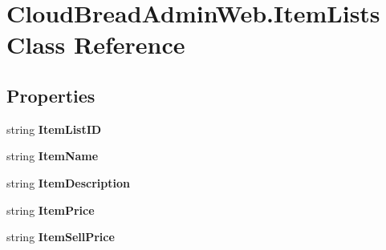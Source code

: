 \hypertarget{class_cloud_bread_admin_web_1_1_item_lists}{}\section{Cloud\+Bread\+Admin\+Web.\+Item\+Lists Class Reference}
\label{class_cloud_bread_admin_web_1_1_item_lists}
\subsection*{Properties}
\begin{DoxyCompactItemize}
\item 
string {\bfseries Item\+List\+ID}\hypertarget{class_cloud_bread_admin_web_1_1_item_lists_aef30485acfa501623200c6cea60c653c}{}\label{class_cloud_bread_admin_web_1_1_item_lists_aef30485acfa501623200c6cea60c653c}

\item 
string {\bfseries Item\+Name}\hypertarget{class_cloud_bread_admin_web_1_1_item_lists_acf1f8543fd3893e67f336b8a3f2e2acf}{}\label{class_cloud_bread_admin_web_1_1_item_lists_acf1f8543fd3893e67f336b8a3f2e2acf}

\item 
string {\bfseries Item\+Description}\hypertarget{class_cloud_bread_admin_web_1_1_item_lists_ace98eb34ef0012970ad9ae49492f8c45}{}\label{class_cloud_bread_admin_web_1_1_item_lists_ace98eb34ef0012970ad9ae49492f8c45}

\item 
string {\bfseries Item\+Price}\hypertarget{class_cloud_bread_admin_web_1_1_item_lists_ac63bec8c4fff2ff8b882871448e76f51}{}\label{class_cloud_bread_admin_web_1_1_item_lists_ac63bec8c4fff2ff8b882871448e76f51}

\item 
string {\bfseries Item\+Sell\+Price}\hypertarget{class_cloud_bread_admin_web_1_1_item_lists_aa6859385a15234c0a4bf2274938ee407}{}\label{class_cloud_bread_admin_web_1_1_item_lists_aa6859385a15234c0a4bf2274938ee407}


\end{DoxyCompactItemize}
